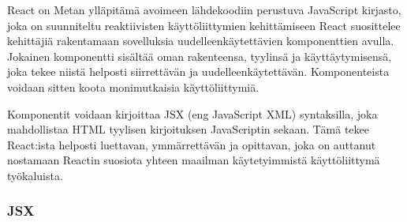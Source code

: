 
















React on Metan ylläpitämä avoimeen lähdekoodiin perustuva JavaScript kirjasto,
joka on suunniteltu reaktiivisten käyttöliittymien kehittämiseen
React suosittelee kehittäjiä rakentamaan sovelluksia uudelleenkäytettävien komponenttien avulla.
Jokainen komponentti sisältää oman rakenteensa, tyylinsä ja käyttäytymisensä, joka tekee niistä helposti siirrettävän ja uudelleenkäytettävän.
Komponenteista voidaan sitten koota monimutkaisia käyttöliittymiä. 
\medskip


Komponentit voidaan kirjoittaa JSX (eng JavaScript XML) syntaksilla, joka mahdollistaa HTML tyylisen kirjoituksen JavaScriptin sekaan.
Tämä tekee React:ista helposti luettavan, ymmärrettävän ja opittavan,
joka on auttanut nostamaan Reactin suosiota yhteen maailman käytetyimmistä käyttöliittymä työkaluista.
\medskip









\subsubsection{JSX}








